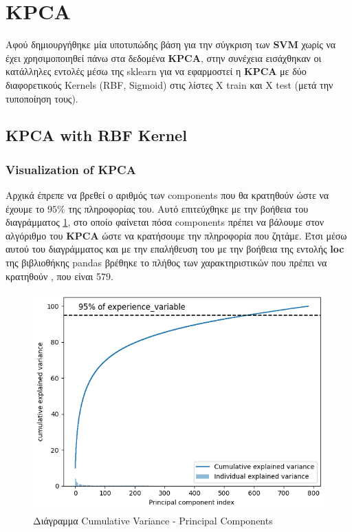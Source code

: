 \section{KPCA}

Αφού δημιουργήθηκε μία υποτυπώδης βάση για την σύγκριση των \textbf{SVM} χωρίς να έχει χρησιμοποιηθεί πάνω στα δεδομένα \textbf{KPCA}, στην συνέχεια εισάχθηκαν οι κατάλληλες εντολές μέσω της sklearn για να εφαρμοστεί η \textbf{KPCA} με δύο διαφορετικούς Κernels (RBF, Sigmoid) στις λίστες Χ train και Χ test (μετά την τυποποίηση τους).


\subsection{KPCA with RBF Kernel}

\subsubsection{Visualization of KPCA}
Αρχικά έπρεπε να βρεθεί ο αριθμός των components που θα κρατηθούν ώστε να έχουμε το $95\%$ της πληροφορίας του. Αυτό επιτεύχθηκε με την βοήθεια του διαγράμματος \ref{f:g1}, στο οποίο φαίνεται πόσα components πρέπει να βάλουμε στον αλγόριθμο του \textbf{KPCA} ώστε να κρατήσουμε την πληροφορία που ζητάμε. Έτσι μέσω αυτού του διαγράμματος και με την επαλήθευση του με την βοήθεια της εντολής \textbf{loc} της βιβλιοθήκης pandas βρέθηκε το πλήθος των χαρακτηριστικών που πρέπει να κρατηθούν , που είναι 579.


\begin{figure}[ht]
	\centering
	\includegraphics[width=1\linewidth]{Images data1/KPCARBFplot.png}
	\caption{ Διάγραμμα Cumulative Variance - Principal Components   }
	\label{f:g1}	
\end{figure}
\clearpage
